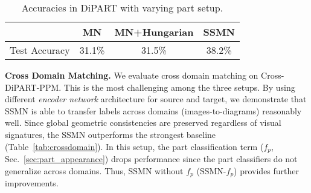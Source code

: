 \documentclass[10pt,twocolumn,letterpaper]{article}
\begin{document}
\vspace{-.5em}\begin{table}[h]
    \centering
    \begin{tabular}{cccc}
        \toprule
                        & MN        & MN+Hungarian  & SSMN       \\
        \hline
        Test Accuracy   & 31.1\%    & 31.5\%        & 38.2\% \\
        \bottomrule
    \end{tabular}
    \caption{Accuracies in DiPART with varying part setup.}
    \vspace{-0.5em}
    \label{tab:varypart}
\end{table}\noindent\textbf{Cross Domain Matching.}
We evaluate cross domain matching on Cross-DiPART-PPM. This is the most challenging among the three setups. By using different \emph{encoder network} architecture for source and target, we demonstrate that SSMN is able to transfer labels across domains (images-to-diagrams) reasonably well. Since global geometric consistencies are preserved regardless of visual signatures, the SSMN outperforms the strongest baseline (Table~\ref{tab:crossdomain}). In this setup, the part classification term ($f_p$, Sec.~\ref{sec:part_appearance}) drops performance since the part classifiers do not generalize across domains. Thus, SSMN without $f_p$ (SSMN-$f_p$) provides further improvements.
\vspace{-0.5em}\begin{table}[h]
    \centering
    \caption{Cross domain accuracies (Cross-DiPART-PPM data)}
    \vspace{-0.5em}
    \label{tab:crossdomain}
\end{table}%
\vspace{-.5em}
\end{document}
